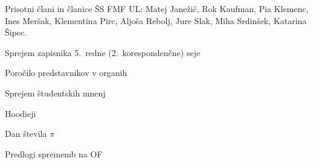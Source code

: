\documentclass{seja}
\begin{document}
Prisotni člani in članice ŠS FMF UL:
Matej Janežič,
Rok Kaufman,
Pia Klemenc,
Ines Meršak,
Klementina Pirc,
Aljoša Rebolj,
Jure Slak,
Miha Srdinšek,
Katarina Šipec.

\begin{red*}
	\item
	Sprejem zapisnika 5.~redne (2.~korespondenčne) seje
	\item
	Poročilo predstavnikov v organih
    \item
    Sprejem študentskih mnenj
    \item
    Hoodieji
    \item
    Dan števila $\pi$
    \item
    Predlogi sprememb na OF
\end{red*}
\end{document}
